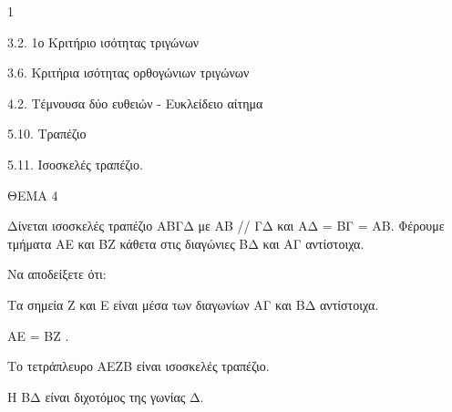 \begin{ylh}{1}
    \item 3.2. 1ο Κριτήριο ισότητας τριγώνων
    \item 3.6. Κριτήρια ισότητας ορθογώνιων τριγώνων
    \item 4.2. Τέμνουσα δύο ευθειών - Ευκλείδειο αίτημα
    \item 5.10. Τραπέζιο
    \item 5.11. Ισοσκελές τραπέζιο.
\end{ylh}

ΘΕΜΑ 4

Δίνεται ισοσκελές τραπέζιο ΑΒΓΔ με ΑΒ // ΓΔ και ΑΔ = ΒΓ = ΑΒ. Φέρουμε τμήματα ΑΕ και ΒΖ κάθετα στις διαγώνιες ΒΔ και ΑΓ αντίστοιχα.

Να αποδείξετε ότι:

\begin{alist}
\item Τα σημεία Ζ και Ε είναι μέσα των διαγωνίων ΑΓ και ΒΔ αντίστοιχα. 

\item ΑΕ = ΒΖ . 

\item Το τετράπλευρο ΑΕΖΒ είναι ισοσκελές τραπέζιο. 

\item Η ΒΔ είναι διχοτόμος της γωνίας Δ. 


\end{alist}
